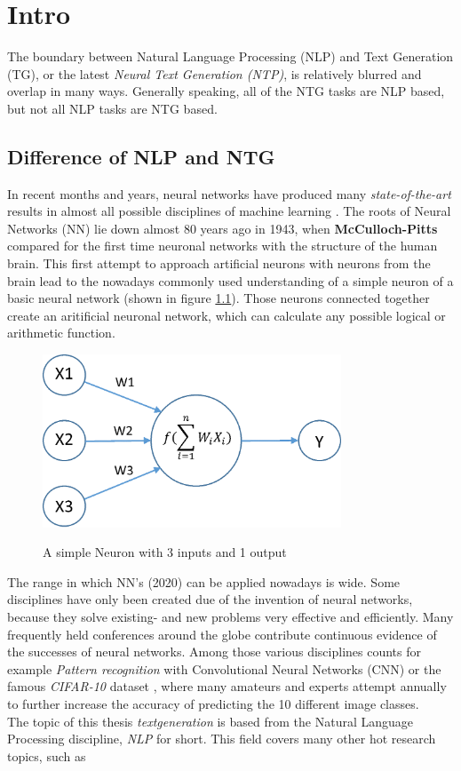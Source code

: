 \chapter{Intro}\label{ch:intro}

The boundary between Natural Language Processing (NLP) and Text Generation (TG), or the latest \textit{Neural Text Generation (NTP)}, is relatively blurred and overlap in many ways. Generally speaking, all of the NTG tasks are NLP based, but not all NLP tasks are NTG based.

\section{Difference of NLP and NTG}
In recent months and years, neural networks have produced many \textit{state-of-the-art} results in almost all possible disciplines of machine learning \cite{NTG2}. The roots of Neural Networks (NN) lie down almost 80 years ago in 1943, when \textbf{McCulloch-Pitts} \cite{NN} compared for the first time neuronal networks with the structure of the human brain. This first attempt to approach artificial neurons with neurons from the brain lead to the nowadays commonly used understanding of a simple neuron of a basic neural network (shown in figure \ref{neuron}). Those neurons connected together create an aritificial neuronal network, which can calculate any possible logical or arithmetic function. 

\begin{figure}
  \begin{center}
  \includegraphics[width=3.5in]{photos/neuron}\\
  \caption{A simple Neuron with 3 inputs and 1 output \cite{neuron}}\label{neuron}
  \end{center}
\end{figure}

The range in which NN's (2020) can be applied nowadays is wide. Some disciplines have only been created due of the invention of neural networks, because they solve existing- and new problems very effective and efficiently. Many frequently held conferences around the globe contribute continuous evidence of the successes of neural networks. Among those various disciplines counts for example \textit{Pattern recognition} with Convolutional Neural Networks (CNN) \cite{cnn} or the famous \textit{CIFAR-10} dataset \cite{cifar}, where many amateurs \cite{tim} and experts attempt annually to further increase the accuracy of predicting the 10 different image classes. \\
The topic of this thesis \textit{textgeneration} is based from the Natural Language Processing discipline, \textit{NLP} for short. This field covers many other hot research topics, such as 

